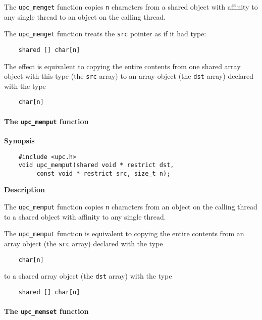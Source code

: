\np The {\tt upc\_memget} function copies {\tt n} characters from a
   shared object with affinity to any single thread to an object on the calling thread.

\np The {\tt upc\_memget} function treats the {\tt src}
   pointer as if it had type:

\begin{verbatim}
    shared [] char[n] 
\end{verbatim}

   The effect is equivalent to copying the entire contents from one
   shared array object with this type (the {\tt src} array) to an array
   object (the {\tt dst} array) declared with the type

\begin{verbatim}
    char[n] 
\end{verbatim}

\paragraph{The {\tt upc\_memput} function}

{\bf Synopsis} 

\npf\vspace{-2.5em}
\begin{verbatim}
    #include <upc.h> 
    void upc_memput(shared void * restrict dst,
         const void * restrict src, size_t n); 
\end{verbatim}

{\bf Description}
 
\np The {\tt upc\_memput} function copies {\tt n} characters from
   an object on the calling thread to a shared object with affinity
   to any single thread.
   
\np The {\tt upc\_memput} function is equivalent to copying the
   entire contents from an array object (the {\tt src} array) declared
   with the type

\begin{verbatim}
    char[n] 
\end{verbatim}

   to a shared array object (the {\tt dst} array) with the type 

\begin{verbatim}
    shared [] char[n] 
\end{verbatim}

\paragraph{The {\tt upc\_memset} function}

